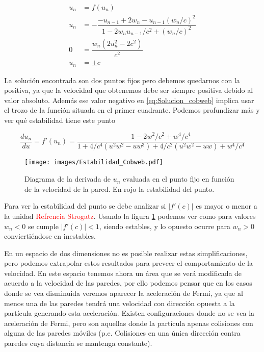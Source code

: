 \documentclass[11pt, spanish]{book}
\begin{document}
\begin{align}\label{eq:Solucion_cobweb}
    u_n &= f(u_n) \nonumber\\
    u_n &= -\dfrac{-u_{n-1} + 2w_n - u_{n-1}(w_n/c)^2}{1 - 2w_n u_{n-1}/c^2 + (w_n/c)^2} \\
    0 &= \dfrac{w_n\left( 2u_n^2-2c^2 \right)}{c^2} \nonumber\\
    u_n &= \pm c \nonumber
\end{align}

\vspace{3mm}

La solución encontrada son dos puntos fijos pero debemos quedarnos con la positiva, ya que la velocidad que obtenemos debe ser siempre positiva debido al valor absoluto. Además ese valor negativo en \ref{eq:Solucion_cobweb} implica usar el trozo de la función situada en el primer cuadrante. Podemos profundizar más y ver qué estabilidad tiene este punto

\begin{equation}
    \dfrac{du_n}{du} = f'(u_n) = \dfrac{1 - 2w^2/c^2 + w^4/c^4}{1 + 4/c^4\left( u^2w^2-uw^3 \right) + 4/c^2\left( u^2w^2-uw \right) + w^4/c^4}
\end{equation}

\begin{figure}[H]
    \centering
    \texttt{[image: images/Estabilidad\_Cobweb.pdf]}
    \caption{Diagrama de la derivada de $u_n$ evaluada en el punto fijo en función de la velocidad de la pared. En rojo la estabilidad del punto.}
    \label{fig:estabilidad_cobweb}
\end{figure}

\vspace{3mm}

Para ver la estabilidad del punto se debe analizar si \( \left| f'(c) \right| \) es mayor o menor a la unidad \textcolor{red}{Refrencia Strogatz}. Usando la figura \ref{fig:estabilidad_cobweb} podemos ver como para valores \( w_n < 0 \) se cumple \( \left| f'(c) \right| < 1 \), siendo estables, y lo opuesto ocurre para \( w_n > 0 \) conviertiéndose en inestables.

\vspace{3mm}

En un espacio de dos dimensiones no es posible realizar estas simplificaciones, pero podemos extrapolar estos resultados para preveer el comportamiento de la velocidad. En este espacio tenemos ahora un área que se verá modificada de acuerdo a la velocidad de las paredes, por ello podemos pensar que en los casos donde se vea disminuida veremos aparecer la aceleración de Fermi, ya que al menos una de las paredes tendrá una velocidad con dirección opuesta a la partícula generando esta aceleración. Existen configuraciones donde no se vea la aceleración de Fermi, pero son aquellas donde la partícula apenas colisiones con alguna de las paredes móviles (p.e. Colisiones en una única dirección contra paredes cuya distancia se mantenga constante).
\end{document}
